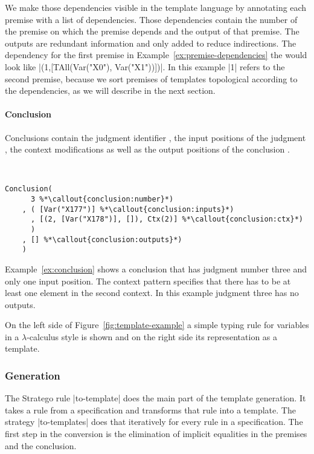 We make those dependencies visible in the template language by
annotating each premise with a list of dependencies. Those
dependencies contain the number of the premise on which the premise
depends and the output of that premise. The outputs are redundant
information and only added to reduce indirections.
The dependency for the first premise in
Example~\ref{ex:premise-dependencies} the would look like
\code|(1,[TAll(Var("X0"), Var("X1"))])|. In this example \code|1| refers to the
second premise, because we sort premises of templates topological
according to the dependencies, as we will describe in the next
section.

\paragraph{Conclusion}
Conclusions contain the judgment identifier
, the input positions of the judgment
, the context modifications
 as well as the output positions of the
conclusion .

\begin{example}{~}
\begin{lstlisting}[language=sltc]
Conclusion(
      3 %*\callout{conclusion:number}*)
    , ( [Var("X177")] %*\callout{conclusion:inputs}*)
      , [(2, [Var("X178")], []), Ctx(2)] %*\callout{conclusion:ctx}*)
      )
    , [] %*\callout{conclusion:outputs}*)
    )
\end{lstlisting}
\label{ex:conclusion}
\end{example}

Example~\ref{ex:conclusion} shows a conclusion that has judgment
number three and only one input position. The context pattern specifies
that there has to be at least one element in the second context. In
this example judgment three has no outputs.

On the left side of Figure~\ref{fig:template-example} a simple typing
rule for variables in a $\lambda$-calculus style is shown and on the
right side its representation as a template.

\subsubsection{Generation}
The Stratego rule \code|to-template| does the main part of the
template generation. It takes a rule from a specification and
transforms that rule into a template. The strategy \code|to-templates| does
that iteratively for every rule in a specification. The first step in
the conversion is the elimination of implicit equalities in the
premises and the conclusion.

